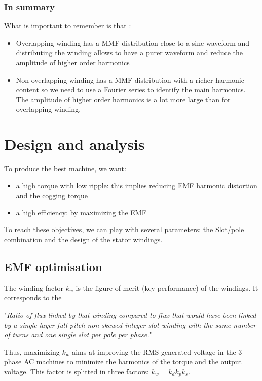 \subsubsection{In summary}
What is important to remember is that :
\begin{itemize}
    \item Overlapping winding has a MMF distribution close to a sine waveform and distributing the winding allows to have a purer waveform and reduce the amplitude of higher order harmonics
    \item Non-overlapping winding has a MMF distribution with a richer harmonic content so we need to use a Fourier series to identify the main harmonics. The amplitude of higher order harmonics is a lot more large than for overlapping winding.
\end{itemize}

\section{Design and analysis}

To produce the best machine, we want:

\begin{itemize}
    \item a high torque with low ripple: this implies reducing EMF harmonic distortion and the cogging torque
    \item a high efficiency: by maximizing the EMF
\end{itemize}

To reach these objectives, we can play with several parameters: the Slot/pole combination and the design of the stator windings.

\subsection{EMF optimisation}

The winding factor $k_w$ is the figure of merit (key performance) of the windings. It corresponds to the

"\textit{Ratio of flux linked by that winding compared to flux that would have been linked by a single-layer
full-pitch non-skewed integer-slot winding with the same number of turns and one single slot per
pole per phase.}"

Thus, maximizing $k_w$ aims at improving the RMS generated voltage in the 3-phase AC machines to minimize
the harmonics of the torque and the output voltage. This factor is splitted in three factors: $ k_w = k_d k_p k_s$.

